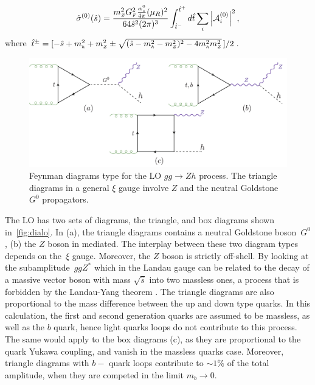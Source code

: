 \begin{equation}
\hat{\sigma}^{(0)}(\hat{s})=
\frac{m_{ \scriptscriptstyle Z}^2 G_{ \scriptscriptstyle F}^2 \frac{\alpha_s^0}{4 \pi}(\mu_R)^2}{64 \hat{s}^2(2\pi)^3}
\int^{\hat{t}^+}_{\hat{t}^-}d\hat{t}\sum_i \left|{\cal A}_i^{(0)}\right|^2,
\end{equation}
where
$\hat{t}^\pm=[-\hat{s}+m_{ \scriptscriptstyle h}^2+m_{ \scriptscriptstyle Z}^2\pm\sqrt{(\hat{s}-m_{ \scriptscriptstyle h}^2-m_{ \scriptscriptstyle Z}^2)^2-4m_{ \scriptscriptstyle h}^2m_{ \scriptscriptstyle Z}^2}\,]/2$.
\begin{figure}
	\begin{center}
		\includegraphics[width=12cm]{./figures/Feynman_LO}
		\caption{Feynman diagrams type for the LO $gg \to Zh$ process. The triangle diagrams in a general $\xi$ gauge involve $Z$ and the neutral Goldstone~$G^0$ propagators. }
		\label{fig:dialo}
	\end{center}
\end{figure}
\par The LO has two sets of diagrams, the triangle, and box diagrams shown in~\autoref{fig:dialo}. In (a), the triangle diagrams contains a neutral Goldstone boson~$G^0$, (b) the $Z$ boson in mediated. The interplay between these two diagram types depends on the~$\xi$ gauge. Moreover, the $Z$ boson is strictly off-shell. By looking at the subamplitude~$ggZ^*$ which in the Landau gauge can be related to the decay of a massive vector boson
with mass $\sqrt{\hat{s}}$ into two massless ones, a process that is
forbidden by the Landau-Yang theorem \cite{Landau:1948kw,Yang:1950rg}.
The triangle diagrams are also proportional to the mass difference between the up and down type quarks. In this calculation, the first and second generation quarks are assumed to be massless, as well as the $b$ quark, hence light quarks loops  do not contribute to this process. The same would apply to the box diagrams (c), as they are proportional to the quark Yukawa coupling, and vanish in the massless quarks case. Moreover, triangle diagrams with $b-$ quark loops contribute to $ \sim 1\%$ of the total amplitude, when they are competed in the limit $m_b \to 0$.  

